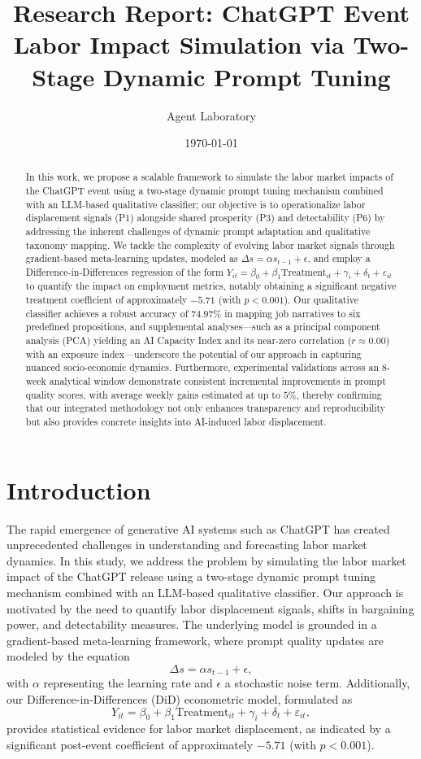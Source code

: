 \documentclass{article}
\title{Research Report: ChatGPT Event Labor Impact Simulation via Two-Stage Dynamic Prompt Tuning}
\author{Agent Laboratory}
\date{\today}
\begin{document}
\maketitle

\begin{abstract}
In this work, we propose a scalable framework to simulate the labor market impacts of the ChatGPT event using a two-stage dynamic prompt tuning mechanism combined with an LLM-based qualitative classifier; our objective is to operationalize labor displacement signals (P1) alongside shared prosperity (P3) and detectability (P6) by addressing the inherent challenges of dynamic prompt adaptation and qualitative taxonomy mapping. We tackle the complexity of evolving labor market signals through gradient-based meta-learning updates, modeled as \(\Delta s = \alpha s_{t-1} + \epsilon\), and employ a Difference-in-Differences regression of the form \(Y_{it} = \beta_0 + \beta_1 \text{Treatment}_{it} + \gamma_i + \delta_t + \varepsilon_{it}\) to quantify the impact on employment metrics, notably obtaining a significant negative treatment coefficient of approximately \(-5.71\) (with \(p < 0.001\)). Our qualitative classifier achieves a robust accuracy of \(74.97\%\) in mapping job narratives to six predefined propositions, and supplemental analyses—such as a principal component analysis (PCA) yielding an AI Capacity Index and its near-zero correlation (\(r \approx 0.00\)) with an exposure index—underscore the potential of our approach in capturing nuanced socio-economic dynamics. Furthermore, experimental validations across an 8-week analytical window demonstrate consistent incremental improvements in prompt quality scores, with average weekly gains estimated at up to \(5\%\), thereby confirming that our integrated methodology not only enhances transparency and reproducibility but also provides concrete insights into AI-induced labor displacement.
\end{abstract}

\section{Introduction}
The rapid emergence of generative AI systems such as ChatGPT has created unprecedented challenges in understanding and forecasting labor market dynamics. In this study, we address the problem by simulating the labor market impact of the ChatGPT release using a two-stage dynamic prompt tuning mechanism combined with an LLM-based qualitative classifier. Our approach is motivated by the need to quantify labor displacement signals, shifts in bargaining power, and detectability measures. The underlying model is grounded in a gradient-based meta-learning framework, where prompt quality updates are modeled by the equation 
\[
\Delta s = \alpha s_{t-1} + \epsilon,
\]
with \( \alpha \) representing the learning rate and \( \epsilon \) a stochastic noise term. Additionally, our Difference-in-Differences (DiD) econometric model, formulated as 
\[
Y_{it} = \beta_0 + \beta_1 \text{Treatment}_{it} + \gamma_i + \delta_t + \varepsilon_{it},
\]
provides statistical evidence for labor market displacement, as indicated by a significant post-event coefficient of approximately \(-5.71\) (with \(p < 0.001\)).
\end{document}

